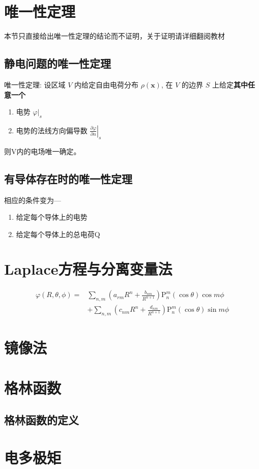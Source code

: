 \section{唯一性定理}
    本节只直接给出唯一性定理的结论而不证明，关于证明请详细翻阅教材
    \subsection{静电问题的唯一性定理}
    唯一性定理: 设区域 $V$ 内给定自由电荷分布 $\rho(\boldsymbol{x})$, 在 $V$ 的边界 $S$ 上给定\textbf{其中任意一个}
        \begin{enumerate}[(1)]
            \item 电势 $\left.\varphi\right|_{s}$
            \item 电势的法线方向偏导数 $\left.\frac{\partial \varphi}{\partial n}\right|_{s}$
        \end{enumerate}
        则V内的电场唯一确定。
    \subsection{有导体存在时的唯一性定理}
        相应的条件变为—
        \begin{enumerate}[(1)]
            \item 给定每个导体上的电势
            \item 给定每个导体上的总电荷Q
        \end{enumerate}
\section{Laplace方程与分离变量法}
    \begin{equation}
    \begin{aligned}
    \varphi(R, \theta, \phi)=& \sum_{n, m}\left(a_{r m} R^{n}+\frac{b_{n m}}{R^{n+1}}\right) \mathrm{P}_{n}^{m}(\cos \theta) \cos m \phi \\
    &+\sum_{n, m}\left(c_{n m} R^{n}+\frac{d_{n m}}{R^{n+1}}\right) \mathrm{P}_{n}^{m}(\cos \theta) \sin m \phi
    \end{aligned}
    \end{equation}
\section{镜像法}
\section{格林函数}
    \subsection{格林函数的定义}
\section{电多极矩}
    